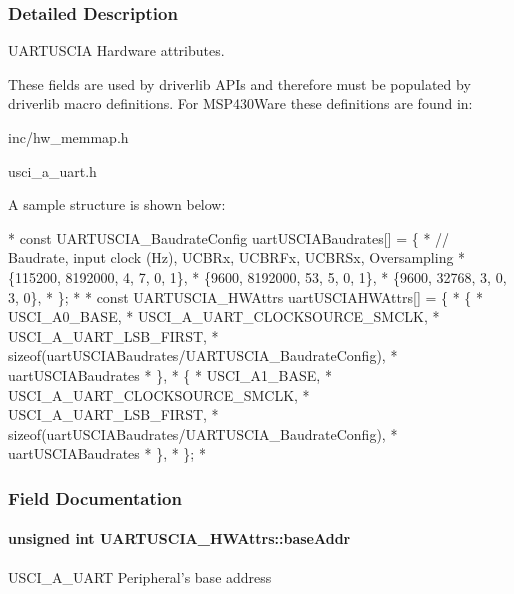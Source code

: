 \subsubsection{Detailed Description}
U\-A\-R\-T\-U\-S\-C\-I\-A Hardware attributes. 

These fields are used by driverlib A\-P\-Is and therefore must be populated by driverlib macro definitions. For M\-S\-P430\-Ware these definitions are found in\-:
\begin{DoxyItemize}
\item inc/hw\-\_\-memmap.\-h
\item usci\-\_\-a\-\_\-uart.\-h
\end{DoxyItemize}

A sample structure is shown below\-: 
\begin{DoxyCode}
*  \textcolor{keyword}{const} UARTUSCIA_BaudrateConfig uartUSCIABaudrates[] = \{
*   \textcolor{comment}{// Baudrate, input clock (Hz), UCBRx, UCBRFx, UCBRSx, Oversampling}
*      \{115200,  8192000,          4,     7,      0,      1\},
*      \{9600,    8192000,          53,    5,      0,      1\},
*      \{9600,    32768,            3,     0,      3,      0\},
*  \};
*
*  \textcolor{keyword}{const} UARTUSCIA_HWAttrs uartUSCIAHWAttrs[] = \{
*      \{
*          USCI\_A0\_BASE,
*          USCI\_A\_UART\_CLOCKSOURCE\_SMCLK,
*          USCI\_A\_UART\_LSB\_FIRST,
*          \textcolor{keyword}{sizeof}(uartUSCIABaudrates/UARTUSCIA_BaudrateConfig),
*          uartUSCIABaudrates
*      \},
*      \{
*          USCI\_A1\_BASE,
*          USCI\_A\_UART\_CLOCKSOURCE\_SMCLK,
*          USCI\_A\_UART\_LSB\_FIRST,
*          \textcolor{keyword}{sizeof}(uartUSCIABaudrates/UARTUSCIA_BaudrateConfig),
*          uartUSCIABaudrates
*      \},
*  \};
*  
\end{DoxyCode}
 

\subsubsection{Field Documentation}
\paragraph[{base\-Addr}]{\setlength{\rightskip}{0pt plus 5cm}unsigned int U\-A\-R\-T\-U\-S\-C\-I\-A\-\_\-\-H\-W\-Attrs\-::base\-Addr}\label{struct_u_a_r_t_u_s_c_i_a___h_w_attrs_aceece5625f03db035c4602c1f67e8038}
U\-S\-C\-I\-\_\-\-A\-\_\-\-U\-A\-R\-T Peripheral's base address 
